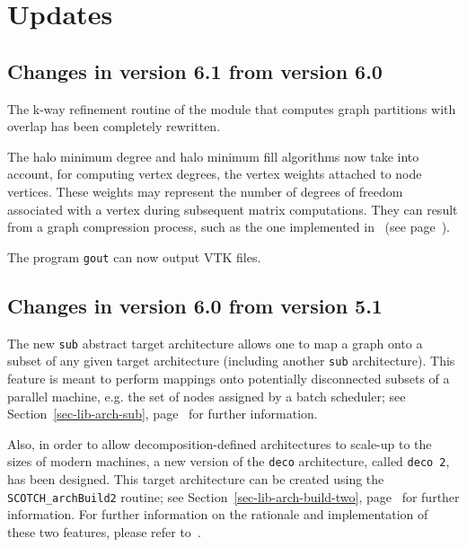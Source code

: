 
\section{Updates}
\label{sec-changes}

\subsection{Changes in version 6.1 from version 6.0}

The k-way refinement routine of the module that computes graph
partitions with overlap has been completely rewritten.

The halo minimum degree and halo minimum fill algorithms now take into
account, for computing vertex degrees, the vertex weights attached to
node vertices. These weights may represent the number of degrees of
freedom associated with a vertex during subsequent matrix
computations. They can result from a graph compression process, such
as the one implemented in \scotch\ (see
page~\pageref{sec-lib-meth-compress}).

The program \texttt{gout} can now output VTK files.

\subsection{Changes in version 6.0 from version 5.1}

The new \texttt{sub} abstract target architecture allows one to map a
graph onto a subset of any given target architecture (including
another \texttt{sub} architecture). This feature is meant to perform
mappings onto potentially disconnected subsets of a parallel machine,
e.g. the set of nodes assigned by a batch scheduler; see
Section~\ref{sec-lib-arch-sub}, page~\pageref{sec-lib-arch-sub} for
further information.

Also, in order to allow decomposition-defined architectures to
scale-up to the sizes of modern machines, a new version of the
\texttt{deco} architecture, called \texttt{deco~2}, has been
designed. This target architecture can be created using the 
\texttt{SCOTCH\_\lbt arch\lbt Build2} routine; see
Section~\ref{sec-lib-arch-build-two},
page~\pageref{sec-lib-arch-build-two} for further information.
For further information on the rationale and implementation of these
two features, please refer to~\cite{pellegrini:hal-01671156}.

